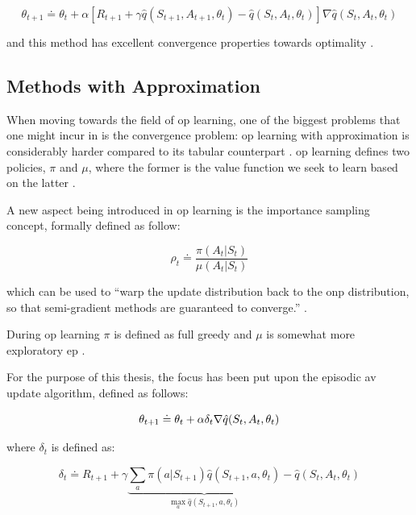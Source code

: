 \begin{equation}
	\theta_{t+1} \doteq \theta_t + \alpha [ R_{t+1} + \gamma \hat{q} (S_{t+1}, A_{t+1}, \theta_t) - \hat{q} (S_t, A_t, \theta_t) ] \nabla \hat{q} (S_t, A_t, \theta_t)
\end{equation}

and this method has excellent convergence properties towards optimality \citep[p. 230]{Sutton2017}.

\subsection{ Methods with Approximation}
\label{subsec:offpol_methods}

When moving towards the field of \gls{op} learning, one of the biggest problems that one might incur in is the convergence problem: \gls{op} learning with approximation is considerably harder compared to its tabular counterpart \citep[p. 243]{Sutton2017}. \gls{op} learning defines two policies, $\pi$ and $\mu$, where the former is the value function we seek to learn based on the latter \citep[p. 243]{Sutton2017}.

A new aspect being introduced in \gls{op} learning is the importance sampling concept, formally defined as follow:

\begin{equation}
\label{eq:importance_sampling}
	\rho_t \doteq \frac{\pi(A_t|S_t)}{\mu(A_t|S_t)}
\end{equation}

which can be used to ``warp the update distribution back to the \gls{onp} distribution, so that semi-gradient methods are guaranteed to converge.'' \citep[p. 243]{Sutton2017}.

During \gls{op} learning $\pi$ is defined as full greedy and $\mu$ is somewhat more exploratory \gls{ep} \citep[p. 243]{Sutton2017}.

For the purpose of this thesis, the focus has been put upon the episodic \gls{av} update algorithm, defined as follows:

\begin{equation}
	\theta_{t+1} \doteq \theta_t + \alpha \delta_t \nabla \hat{q} (S_t,A_t,\theta_t)\\
\end{equation}

where $\delta_t$ is defined as:

\begin{equation}
	\delta_t \doteq R_{t+1} + \gamma \underbrace{\sum_a \pi (a|S_{t+1}) \hat{q} (S_{t+1},a,\theta_t)}_{\max_a \hat{q} (S_{t+1},a,\theta_t)} - \hat{q} (S_t,A_t,\theta_t)
\end{equation}

